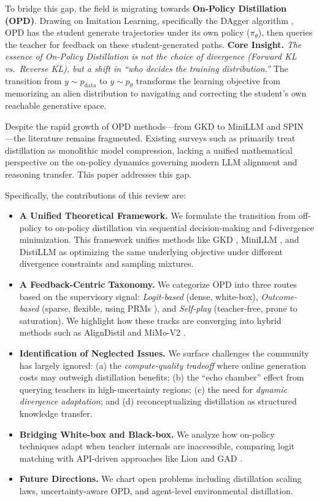 \documentclass{article} %
\newcommand{\ptheta}{p_\theta}
\newcommand{\pdata}{p_{\mathrm{data}}}
\begin{document}
To bridge this gap, the field is migrating towards \textbf{On-Policy Distillation (OPD)}. Drawing on Imitation Learning, specifically the DAgger algorithm \citep{ross2011reduction}, OPD has the student generate trajectories under its own policy ($\pi_\theta$), then queries the teacher for feedback on these student-generated paths.
\textbf{Core Insight.} \textit{The essence of On-Policy Distillation is not the choice of divergence (Forward KL vs.\ Reverse KL), but a shift in ``who decides the training distribution.''} The transition from $y \sim \pdata$ to $y \sim \ptheta$ transforms the learning objective from memorizing an alien distribution to navigating and correcting the student's own reachable generative space.

Despite the rapid growth of OPD methods---from GKD \citep{2306.13649} to MiniLLM \citep{2306.08543} and SPIN \citep{2401.01335}---the literature remains fragmented. Existing surveys such as \citet{2402.13116} primarily treat distillation as monolithic model compression, lacking a unified mathematical perspective on the on-policy dynamics governing modern LLM alignment and reasoning transfer. This paper addresses this gap.

Specifically, the contributions of this review are:
\begin{itemize}
    \item \textbf{A Unified Theoretical Framework.} We formulate the transition from off-policy to on-policy distillation via sequential decision-making and f-divergence minimization. This framework unifies methods like GKD \citep{2306.13649}, MiniLLM \citep{2306.08543}, and DistiLLM \citep{2402.03898} as optimizing the same underlying objective under different divergence constraints and sampling mixtures.
    \item \textbf{A Feedback-Centric Taxonomy.} We categorize OPD into three routes based on the supervisory signal: \textit{Logit-based} (dense, white-box), \textit{Outcome-based} (sparse, flexible, using PRMs \citep{2305.20050}), and \textit{Self-play} (teacher-free, prone to saturation). We highlight how these tracks are converging into hybrid methods such as AlignDistil \citep{2503.02832} and MiMo-V2 \citep{2601.02780}.
    \item \textbf{Identification of Neglected Issues.} We surface challenges the community has largely ignored: (a) the \textit{compute-quality tradeoff} where online generation costs may outweigh distillation benefits; (b) the ``echo chamber'' effect from querying teachers in high-uncertainty regions; (c) the need for \textit{dynamic divergence adaptation}; and (d) reconceptualizing distillation as structured knowledge transfer.
    \item \textbf{Bridging White-box and Black-box.} We analyze how on-policy techniques adapt when teacher internals are inaccessible, comparing logit matching with API-driven approaches like Lion \citep{2305.12870} and GAD \citep{2511.10643}.
    \item \textbf{Future Directions.} We chart open problems including distillation scaling laws, uncertainty-aware OPD, and agent-level environmental distillation.
\end{itemize}
\end{document}
